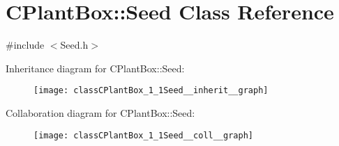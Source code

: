 \hypertarget{classCPlantBox_1_1Seed}{}\section{C\+Plant\+Box\+:\+:Seed Class Reference}
\label{classCPlantBox_1_1Seed}


{\ttfamily \#include $<$Seed.\+h$>$}



Inheritance diagram for C\+Plant\+Box\+:\+:Seed\+:\nopagebreak
\begin{figure}[H]
\begin{center}
\leavevmode
\texttt{[image: classCPlantBox\_1\_1Seed\_\_inherit\_\_graph]}
\end{center}
\end{figure}


Collaboration diagram for C\+Plant\+Box\+:\+:Seed\+:\nopagebreak
\begin{figure}[H]
\begin{center}
\leavevmode
\texttt{[image: classCPlantBox\_1\_1Seed\_\_coll\_\_graph]}
\end{center}
\end{figure}
